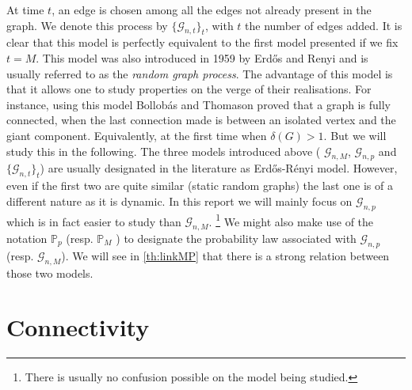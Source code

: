 At time $t$, an edge is chosen among all the edges not already present in the graph. We denote this process by $\{\mathcal{G}_{n, t}\}_t$, with $t$ the number of edges added. 
It is clear that this model is perfectly equivalent to the first model presented if we fix $t = M$. 
This model was also introduced in 1959 by Erd\H{o}s and Renyi and is usually referred to as the \emph{random graph process}.
The advantage of this model is that it allows one to study properties on the verge of their realisations.
For instance, using this model Bollob\'as and Thomason \cite{Bollob85} proved that a graph is fully connected, when the last connection made is between an isolated vertex and the giant component. Equivalently, at the first time when $\delta(G) > 1$. But we will study this in the following.
\newline
The three models introduced above ( $\mathcal{G}_{n, M}$, $\mathcal{G}_{n, p}$ and $\{\mathcal{G}_{n, t}\}_t $) are usually designated in the literature as Erd\H{o}s-R\'enyi model.
However, even if the first two are quite similar (static random graphs) the last one is of a different nature as it is dynamic.
\newline
In this report we will mainly focus on $\mathcal{G}_{n, p}$ which is in fact easier to study than $\mathcal{G}_{n,M}$.
\footnote{There is usually no confusion possible on the model being studied.}
We might also make use of the notation $\mathbb{P}_{p}$ (resp. $\mathbb{P}_{M}$ ) to designate the probability law associated with $\mathcal{G}_{n, p}$ (resp. $\mathcal{G}_{n,M}$).
We will see in \eqref{th:linkMP} that there is a strong relation between those two models.

\section{Connectivity}

